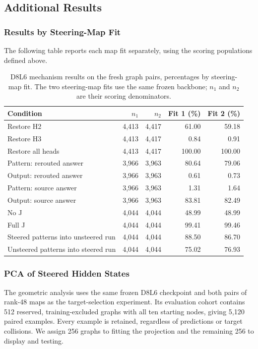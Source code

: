 \documentclass{article}
\begin{document}
\subsection{Additional Results}
\label{app:graph-results}
\subsubsection{Results by Steering-Map Fit}
The following table reports each map fit separately, using the scoring populations defined above.
\begin{table}[!htbp]\centering
\caption{D8L6 mechanism results on the fresh graph pairs, percentages by steering-map fit. The two steering-map fits use the same frozen backbone; $n_1$ and $n_2$ are their scoring denominators.}
\begin{tabular}{@{}lrrrr@{}}\toprule
Condition & $n_1$ & $n_2$ & Fit 1 (\%) & Fit 2 (\%)\\\midrule
Restore H2 & 4,413 & 4,417 & 61.00 & 59.18 \\
Restore H3 & 4,413 & 4,417 & 0.84 & 0.91 \\
Restore all heads & 4,413 & 4,417 & 100.00 & 100.00 \\
Pattern: rerouted answer & 3,966 & 3,963 & 80.64 & 79.06 \\
Output: rerouted answer & 3,966 & 3,963 & 0.61 & 0.73 \\
Pattern: source answer & 3,966 & 3,963 & 1.31 & 1.64 \\
Output: source answer & 3,966 & 3,963 & 83.81 & 82.49 \\
No J & 4,044 & 4,044 & 48.99 & 48.99 \\
Full J & 4,044 & 4,044 & 99.41 & 99.46 \\
Steered patterns into unsteered run & 4,044 & 4,044 & 88.50 & 86.70 \\
Unsteered patterns into steered run & 4,044 & 4,044 & 75.02 & 76.93 \\
\bottomrule\end{tabular}\end{table}

\subsubsection{PCA of Steered Hidden States}
\label{app:target-pca}
The geometric analysis uses the same frozen D8L6 checkpoint and both pairs of rank-48 maps as the target-selection experiment. Its evaluation cohort contains 512 reserved, training-excluded graphs with all ten starting nodes, giving 5,120 paired examples. Every example is retained, regardless of predictions or target collisions. We assign 256 graphs to fitting the projection and the remaining 256 to display and testing.
\end{document}
